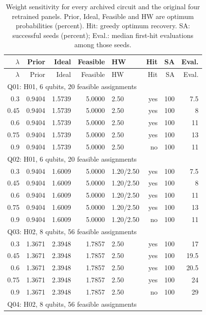 \begingroup
\small
\setlength{\tabcolsep}{4pt}
\begin{longtable}{rrrrlrrr}
\caption{Weight sensitivity for every archived circuit and the original four retrained panels. Prior, Ideal, Feasible and HW are optimum probabilities (percent). Hit: greedy optimum recovery. SA: successful seeds (percent); Eval.: median first-hit evaluations among those seeds.}\\
\toprule
$\lambda$ & Prior & Ideal & Feasible & HW & Hit & SA & Eval.\\
\midrule
\endfirsthead
\toprule
$\lambda$ & Prior & Ideal & Feasible & HW & Hit & SA & Eval.\\
\midrule
\endhead
\multicolumn{8}{l}{Q01: H01, 6 qubits, 20 feasible assignments} \\
0.3 & 0.9404 & 1.5739 & 5.0000 & 2.50 & yes & 100 & 7.5 \\
0.45 & 0.9404 & 1.5739 & 5.0000 & 2.50 & yes & 100 & 8 \\
0.6 & 0.9404 & 1.5739 & 5.0000 & 2.50 & yes & 100 & 11 \\
0.75 & 0.9404 & 1.5739 & 5.0000 & 2.50 & yes & 100 & 13 \\
0.9 & 0.9404 & 1.5739 & 5.0000 & 2.50 & no & 100 & 11 \\
\multicolumn{8}{l}{Q02: H01, 6 qubits, 20 feasible assignments} \\
0.3 & 0.9404 & 1.6009 & 5.0000 & 1.20/2.50 & yes & 100 & 7.5 \\
0.45 & 0.9404 & 1.6009 & 5.0000 & 1.20/2.50 & yes & 100 & 8 \\
0.6 & 0.9404 & 1.6009 & 5.0000 & 1.20/2.50 & yes & 100 & 11 \\
0.75 & 0.9404 & 1.6009 & 5.0000 & 1.20/2.50 & yes & 100 & 13 \\
0.9 & 0.9404 & 1.6009 & 5.0000 & 1.20/2.50 & no & 100 & 11 \\
\multicolumn{8}{l}{Q03: H02, 8 qubits, 56 feasible assignments} \\
0.3 & 1.3671 & 2.3948 & 1.7857 & 2.50 & yes & 100 & 17 \\
0.45 & 1.3671 & 2.3948 & 1.7857 & 2.50 & yes & 100 & 19.5 \\
0.6 & 1.3671 & 2.3948 & 1.7857 & 2.50 & yes & 100 & 20.5 \\
0.75 & 1.3671 & 2.3948 & 1.7857 & 2.50 & yes & 100 & 24 \\
0.9 & 1.3671 & 2.3948 & 1.7857 & 2.50 & no & 100 & 29 \\
\multicolumn{8}{l}{Q04: H02, 8 qubits, 56 feasible assignments} \\

\end{longtable}
